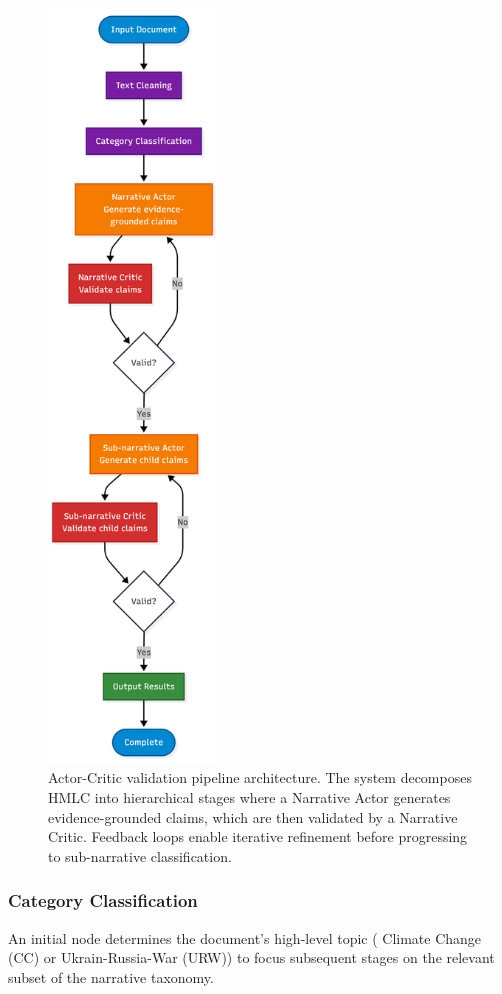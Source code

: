 \begin{figure}[!ht]
\centering
\includegraphics[height=20cm]{assets/diagrams/actor-critique.png}
\caption{Actor-Critic validation pipeline architecture. The system decomposes HMLC into hierarchical stages where a Narrative Actor generates evidence-grounded claims, which are then validated by a Narrative Critic. Feedback loops enable iterative refinement before progressing to sub-narrative classification.}
\label{fig:actor_critic_pipeline}
\end{figure}

\subsubsection{Category Classification}

An initial node determines the document's high-level topic ( Climate Change (CC) or Ukrain-Russia-War (URW)) to focus subsequent stages on the relevant subset of the narrative taxonomy.

